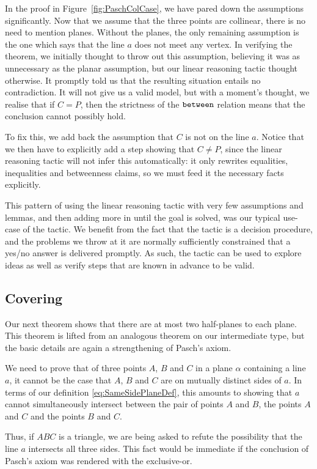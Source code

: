 In the proof in Figure~\ref{fig:PaschColCase}, we have pared down the assumptions significantly. Now that we assume that the three points are collinear, there is no need to mention planes. Without the planes, the only remaining assumption is the one which says that the line $a$ does not meet any vertex. In verifying the theorem, we initially thought to throw out this assumption, believing it was as unnecessary as the planar assumption, but our linear reasoning tactic thought otherwise. It promptly told us that the resulting situation entails no contradiction. It will not give us a valid model, but with a moment's thought, we realise that if $C = P$, then the strictness of the $\texttt{between}$ relation means that the conclusion cannot possibly hold.

To fix this, we add back the assumption that $C$ is not on the line $a$. Notice that we then have to explicitly add a step showing that $C \neq P$, since the linear reasoning tactic will not infer this automatically: it only rewrites equalities, inequalities and betweenness claims, so we must feed it the necessary facts explicitly.

This pattern of using the linear reasoning tactic with very few assumptions and lemmas, and then adding more in until the goal is solved, was our typical use-case of the tactic. We benefit from the fact that the tactic is a decision procedure, and the problems we throw at it are normally sufficiently constrained that a yes/no answer is delivered promptly. As such, the tactic can be used to explore ideas as well as verify steps that are known in advance to be valid.

\subsection{Covering}
Our next theorem shows that there are at most two half-planes to each plane. This theorem is lifted from an analogous theorem on our intermediate type, but the basic details are again a strengthening of Pasch's axiom.

We need to prove that of three points $A$, $B$ and $C$ in a plane $\alpha$ containing a line $a$, it cannot be the case that $A$, $B$ and $C$ are on mutually distinct sides of $a$. In terms of our definition \eqref{eq:SameSidePlaneDef}, this amounts to showing that $a$ cannot simultaneously intersect between the pair of points $A$ and $B$, the points $A$ and $C$ and the points $B$ and $C$. 

\label{sec:PaschInclusiveOr}Thus, if $ABC$ is a triangle, we are being asked to refute the possibility that the line $a$ intersects all three sides. This fact would be immediate if the conclusion of Pasch's axiom was rendered with the exclusive-or. 

